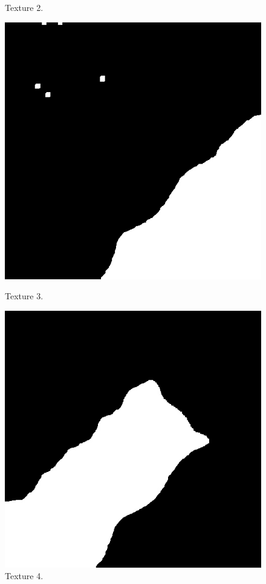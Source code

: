 \documentclass[12pt,a4paper,notitlepage,oneside,amsmath,amssymb]{article}
\begin{document}
\begin{CJK*}{UTF8}{bkai}
\begin{enumerate}[label=(\alph*)]
\begin{enumerate}
\begin{figure}[hbt!]
\begin{minipage}{.25\textwidth}
			\caption*{Texture 2.}
		\end{minipage}%
		\begin{minipage}{.25\textwidth}
			\centering
			\includegraphics[width=.9\linewidth]{sample2_texture3_1}
			\caption*{Texture 3.}
		\end{minipage}%
		\begin{minipage}{.25\textwidth}
			\centering
			\includegraphics[width=.9\linewidth]{sample2_texture4_1}
			\caption*{Texture 4.}
		\end{minipage}
	\end{figure}


\end{enumerate}
\end{enumerate}
\end{CJK*}
\end{document}
